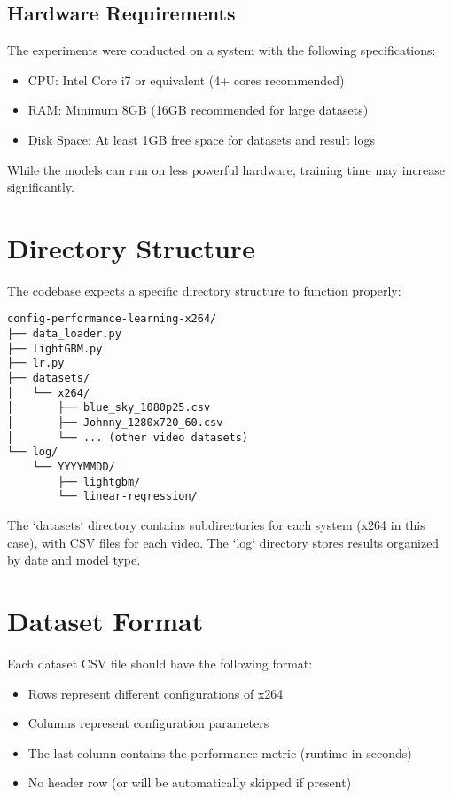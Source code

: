 \documentclass[10pt]{article}
\begin{document}
\subsection{Hardware Requirements}
The experiments were conducted on a system with the following specifications:

\begin{itemize}
    \item CPU: Intel Core i7 or equivalent (4+ cores recommended)
    \item RAM: Minimum 8GB (16GB recommended for large datasets)
    \item Disk Space: At least 1GB free space for datasets and result logs
\end{itemize}

While the models can run on less powerful hardware, training time may increase significantly.

\section{Directory Structure}
The codebase expects a specific directory structure to function properly:

\begin{lstlisting}
config-performance-learning-x264/
├── data_loader.py
├── lightGBM.py
├── lr.py
├── datasets/
│   └── x264/
│       ├── blue_sky_1080p25.csv
│       ├── Johnny_1280x720_60.csv
│       └── ... (other video datasets)
└── log/
    └── YYYYMMDD/
        ├── lightgbm/
        └── linear-regression/
\end{lstlisting}

The `datasets` directory contains subdirectories for each system (x264 in this case), with CSV files for each video. The `log` directory stores results organized by date and model type.

\section{Dataset Format}
Each dataset CSV file should have the following format:

\begin{itemize}
    \item Rows represent different configurations of x264
    \item Columns represent configuration parameters
    \item The last column contains the performance metric (runtime in seconds)
    \item No header row (or will be automatically skipped if present)
\end{itemize}
\end{document}
